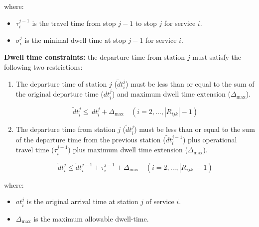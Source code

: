 \documentclass[Afour,sagev,times]{sagej}
\begin{document}
where:
\begin{itemize}
  \item $ \tau_{i}^{j-1}$ is the travel time from stop $j-1$ to stop $j$ for service $i$.
  \item $\sigma_{i}^{j}$ is the minimal dwell time at stop $j-1$ for service $i$.
\end{itemize}

\textbf{Dwell time constraints: }the departure time from station $j$ must satisfy the following two restrictions:

\begin{enumerate}
    \item The departure time of station $ j $ ($  \tilde dt_{i}^{j} $) must be less than or equal to the sum of the original departure time ($ dt_{i}^{j} $) and maximum dwell time extension ($ \Delta_{\max} $).

    \begin{equation}
    \tilde dt_{i}^{j} \leq
    \,dt_{i}^{j} + \Delta_{\max} \quad
    (i=2,\dots,|R_{ijk}| - 1)
    \end{equation}

    
    \item The departure time from station $ j $ ($  \tilde dt_{i}^{j} $) must be less than or equal to the sum of the departure time from the previous station ($ \tilde dt_{i}^{j-1} $) plus operational travel time  ($ \tau_{i}^{j-1} $) plus maximum dwell time extension ($ \Delta_{\max} $).

    \begin{equation}
    \tilde dt_{i}^{j} \leq
    \tilde dt_{i}^{j-1} + \tau_{i}^{j-1} + \Delta_{\max}
    \quad
    (i=2,\dots,|R_{ijk}| - 1)
    \end{equation}
    
\end{enumerate}


where:
\begin{itemize}
  \item $at_{i}^{j}$ is the original arrival time at station $j$ of service $i$.
  \item $\Delta_{\max}$ is the maximum allowable dwell-time.
\end{itemize}
\end{document}
